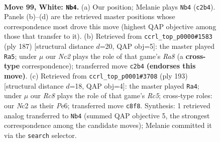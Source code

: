 \documentclass[11pt]{article}
\begin{document}
\clearpage

\begin{figure}[p]\centering
\begin{subfigure}{0.46\textwidth}\centering
\resizebox{\linewidth}{!}{%
\newchessgame
\chessboard[
  setfen={2R5/6p1/5p1k/7p/7P/6PK/2Nr4/8 w - - 22 99},
  showmover=false,
  pgfstyle=straightmove, color=movearrow, markmove={c2-b4}
]}
\caption{}
\end{subfigure}\hfill
\begin{subfigure}{0.46\textwidth}\centering
\resizebox{\linewidth}{!}{%
\newchessgame
\chessboard[
  setfen={8/8/8/6pk/1R4p1/6P1/5PK1/r7 b - - 19 94},
  showmover=false,
  pgfstyle=straightmove, color=movearrow, markmove={a1-a5}
]}
\caption{}
\end{subfigure}
\\[4pt]
\begin{subfigure}{0.46\textwidth}\centering
\resizebox{\linewidth}{!}{%
\newchessgame
\chessboard[
  setfen={8/8/4pk2/6p1/2r3Pp/7P/5PK1/4R3 b - - 82 97},
  showmover=false,
  pgfstyle=straightmove, color=movearrow, markmove={c4-a4}
]}
\caption{}
\end{subfigure}\hfill

\caption{\textbf{Move 99, White: \texttt{Nb4}.} (a) Our position; Melanie plays \texttt{Nb4} (\texttt{c2b4}). Panels (b)--(d) are the retrieved master positions whose correspondence most drove this move (highest QAP objective among those that transfer to it). (b) Retrieved from \texttt{ccrl\_top\_p0000\#1583} (ply 187) [structural distance $d$=20, QAP obj=5]: the master played \texttt{Ra5}; under $\mu$ our \emph{Nc2} plays the role of that game's \emph{Ra8} (a \textbf{cross-type} correspondence); transferred move \texttt{c2b4} \textbf{(endorses this move)}. (c) Retrieved from \texttt{ccrl\_top\_p0001\#3708} (ply 193) [structural distance $d$=18, QAP obj=4]: the master played \texttt{Ra4}; under $\mu$ our \emph{Rc8} plays the role of that game's \emph{Rc5}; cross-type roles: our \emph{N}c2 as their \emph{P}e6; transferred move \texttt{c8f8}. Synthesis: 1 retrieved analog transferred to \texttt{Nb4} (summed QAP objective 5, the strongest correspondence among the candidate moves); Melanie committed it via the \texttt{search} selector.}
\label{fig:thought-m196}
\end{figure}

\clearpage
\end{document}
